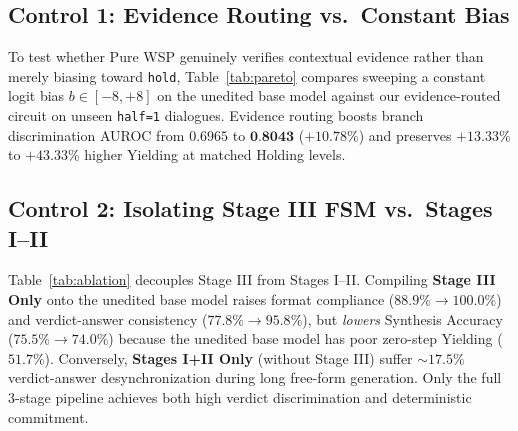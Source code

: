 \documentclass[10pt,twocolumn]{article}
\begin{document}
\subsection{Control 1: Evidence Routing vs.\ Constant Bias}
To test whether Pure WSP genuinely verifies contextual evidence rather than merely biasing toward \texttt{hold}, Table~\ref{tab:pareto} compares sweeping a constant logit bias $b \in [-8, +8]$ on the unedited base model against our evidence-routed circuit on unseen \texttt{half=1} dialogues. Evidence routing boosts branch discrimination AUROC from $0.6965$ to $\textbf{0.8043}$ ($+10.78\%$) and preserves $+13.33\%$ to $+43.33\%$ higher Yielding at matched Holding levels.

\begin{table}[t]
\centering
\caption{\textbf{Decoupled Stage Ablation} isolating Stage III (Layer 35 FSM) from Stages I--II on unseen test dialogues (\texttt{Qwen3-8B}).}
\vspace{3pt}
\label{tab:ablation}
\end{table}

\subsection{Control 2: Isolating Stage III FSM vs.\ Stages I--II}
Table~\ref{tab:ablation} decouples Stage III from Stages I--II. Compiling \textbf{Stage III Only} onto the unedited base model raises format compliance ($88.9\% \to 100.0\%$) and verdict-answer consistency ($77.8\% \to 95.8\%$), but \emph{lowers} Synthesis Accuracy ($75.5\% \to 74.0\%$) because the unedited base model has poor zero-step Yielding ($51.7\%$). Conversely, \textbf{Stages I+II Only} (without Stage III) suffer $\sim 17.5\%$ verdict-answer desynchronization during long free-form generation. Only the full 3-stage pipeline achieves both high verdict discrimination and deterministic commitment.
\end{document}
